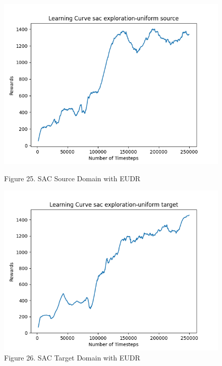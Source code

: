 \documentclass[12pt]{article}
\begin{document}
\begin{figure}[H]
    \centering
    \begin{minipage}{0.45\textwidth}
        \centering
        \includegraphics[width=\textwidth]{../images/Learning_Curve_SAC_EU_Source.png}
        \caption{Figure 25. SAC Source Domain with EUDR}
        \label{fig:sac_source_eudr}
    \end{minipage}
    \hfill
    \begin{minipage}{0.45\textwidth}
        \centering
        \includegraphics[width=\textwidth]{../images/Learning_Curve_SAC_EU_Target.png}
        \caption{Figure 26. SAC Target Domain with EUDR}
        \label{fig:sac_target_eudr}
    \end{minipage}

\end{figure}
\end{document}
